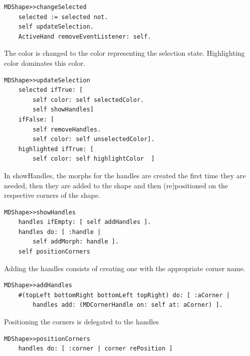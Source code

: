 \documentclass[10pt]{article}   	%
\begin{document}
\begin{verbatim}
MDShape>>changeSelected
    selected := selected not.
    self updateSelection. 
    ActiveHand removeEventListener: self.
\end{verbatim}
The color is changed to the color representing the 
selection state. Highlighting color dominates this color.
\begin{verbatim}
MDShape>>updateSelection
    selected ifTrue: [ 
        self color: self selectedColor.
        self showHandles]
    ifFalse: [ 
        self removeHandles.
        self color: self unselectedColor].
    highlighted ifTrue: [ 
        self color: self highlightColor  ]
\end{verbatim}
In showHandles, the morphs for the handles
are created the first time they are needed, then they are 
added to the shape and then (re)positioned on the respective
corners of the shape.
\begin{verbatim} 
MDShape>>showHandles
    handles ifEmpty: [ self addHandles ].
    handles do: [ :handle |
        self addMorph: handle ].
    self positionCorners
\end{verbatim}
Adding the handles consists of creating one with the
appropriate corner name.
\begin{verbatim}
MDShape>>addHandles
    #(topLeft bottomRight bottomLeft topRight) do: [ :aCorner | 
        handles add: (MDCornerHandle on: self at: aCorner) ].
\end{verbatim}
Positioning the corners is delegated to the handles
\begin{verbatim}
MDShape>>positionCorners
    handles do: [ :corner | corner rePosition ]
\end{verbatim}
\end{document}

